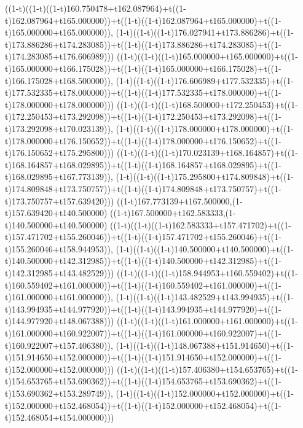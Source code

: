 ((1-t)((1-t)((1-t)160.750478+t162.087964)+t((1-t)162.087964+t165.000000))+t((1-t)((1-t)162.087964+t165.000000)+t((1-t)165.000000+t165.000000)),                                     (1-t)((1-t)((1-t)176.027941+t173.886286)+t((1-t)173.886286+t174.283085))+t((1-t)((1-t)173.886286+t174.283085)+t((1-t)174.283085+t176.606989)))
((1-t)((1-t)((1-t)165.000000+t165.000000)+t((1-t)165.000000+t166.175028))+t((1-t)((1-t)165.000000+t166.175028)+t((1-t)166.175028+t168.500000)),                                     (1-t)((1-t)((1-t)176.606989+t177.532335)+t((1-t)177.532335+t178.000000))+t((1-t)((1-t)177.532335+t178.000000)+t((1-t)178.000000+t178.000000)))
((1-t)((1-t)((1-t)168.500000+t172.250453)+t((1-t)172.250453+t173.292098))+t((1-t)((1-t)172.250453+t173.292098)+t((1-t)173.292098+t170.023139)),                                     (1-t)((1-t)((1-t)178.000000+t178.000000)+t((1-t)178.000000+t176.150652))+t((1-t)((1-t)178.000000+t176.150652)+t((1-t)176.150652+t175.295800)))
((1-t)((1-t)((1-t)170.023139+t168.164857)+t((1-t)168.164857+t168.029895))+t((1-t)((1-t)168.164857+t168.029895)+t((1-t)168.029895+t167.773139)),                                     (1-t)((1-t)((1-t)175.295800+t174.809848)+t((1-t)174.809848+t173.750757))+t((1-t)((1-t)174.809848+t173.750757)+t((1-t)173.750757+t157.639420)))
((1-t)167.773139+t167.500000,(1-t)157.639420+t140.500000)
((1-t)167.500000+t162.583333,(1-t)140.500000+t140.500000)
((1-t)((1-t)((1-t)162.583333+t157.471702)+t((1-t)157.471702+t155.260046))+t((1-t)((1-t)157.471702+t155.260046)+t((1-t)155.260046+t158.944953)),                                     (1-t)((1-t)((1-t)140.500000+t140.500000)+t((1-t)140.500000+t142.312985))+t((1-t)((1-t)140.500000+t142.312985)+t((1-t)142.312985+t143.482529)))
((1-t)((1-t)((1-t)158.944953+t160.559402)+t((1-t)160.559402+t161.000000))+t((1-t)((1-t)160.559402+t161.000000)+t((1-t)161.000000+t161.000000)),                                     (1-t)((1-t)((1-t)143.482529+t143.994935)+t((1-t)143.994935+t144.977920))+t((1-t)((1-t)143.994935+t144.977920)+t((1-t)144.977920+t148.067388)))
((1-t)((1-t)((1-t)161.000000+t161.000000)+t((1-t)161.000000+t160.922007))+t((1-t)((1-t)161.000000+t160.922007)+t((1-t)160.922007+t157.406380)),                                     (1-t)((1-t)((1-t)148.067388+t151.914650)+t((1-t)151.914650+t152.000000))+t((1-t)((1-t)151.914650+t152.000000)+t((1-t)152.000000+t152.000000)))
((1-t)((1-t)((1-t)157.406380+t154.653765)+t((1-t)154.653765+t153.690362))+t((1-t)((1-t)154.653765+t153.690362)+t((1-t)153.690362+t153.289749)),                                     (1-t)((1-t)((1-t)152.000000+t152.000000)+t((1-t)152.000000+t152.468054))+t((1-t)((1-t)152.000000+t152.468054)+t((1-t)152.468054+t154.000000)))
